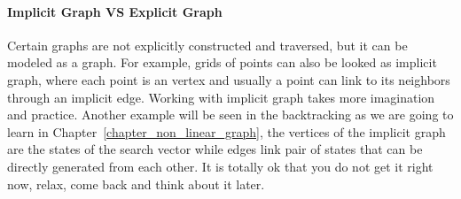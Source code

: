 \documentclass[../main.tex]{subfiles}
\begin{document}
\paragraph{Implicit Graph VS Explicit Graph} Certain graphs are not explicitly constructed and traversed, but it can be modeled as a graph. For example, grids of points can also be looked as implicit graph, where each point is an vertex and usually a point can link to its neighbors through an implicit edge. Working with implicit graph takes more imagination and practice. Another example will be seen in the backtracking as we are going to learn in Chapter~\ref{chapter_non_linear_graph}, the vertices of the implicit graph are the states of  the search vector while edges link pair of states that can be directly generated from each other. It is totally ok that you do not get it right now, relax, come back and think about it later.  
\end{document}
